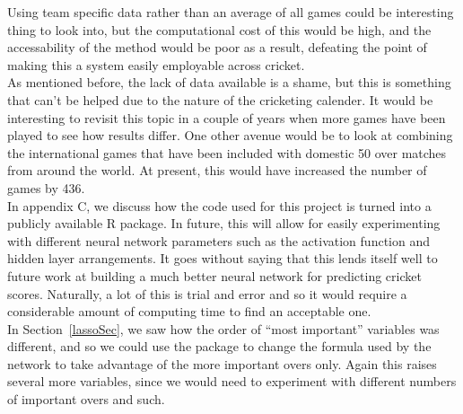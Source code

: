 Using team specific data rather than an average of all games could be interesting thing to look into, but the computational cost of this would be high, and the accessability of the 
method would be poor as a result, defeating the point of making this a system easily employable across cricket. \\

As mentioned before, the lack of data available is a shame, but this is something that can't be helped due to the nature of the cricketing calender. It would be interesting to revisit this topic in a couple of years when more games have been played to see how results differ. One other avenue would be to look at combining the international games that have been included with domestic 50 over matches from around the world. At present, this would have increased the number of games by 436. \\ 

In appendix C, we discuss how the code used for this project is turned into a publicly available R package. In future, this will allow for easily experimenting with different neural 
network parameters such as the activation function and hidden layer arrangements. It goes without saying that this lends itself well to future work at building a much better neural network for predicting cricket scores.
Naturally, a lot of this is trial and error and so it would require a considerable amount of computing time to find an acceptable one. \\

In Section~\ref{lassoSec}, we saw how the order of ``most important'' variables was different, and so we could use the package to change the formula used by the network to take advantage of the more important overs only. Again this raises several more variables, since we would need to experiment with different numbers of important overs and such.
